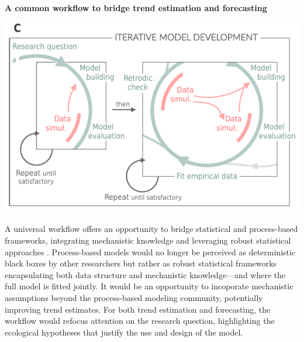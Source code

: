 \documentclass[11pt]{article}
\begin{document}
\begin{tcolorbox}
\centerline{\bf A common workflow to bridge trend estimation and forecasting} %
\vspace*{-3mm}
{\begin{multicols}{2}
\begin{minipage}[t]{\linewidth}
	\vfill
\includegraphics[width=\linewidth]{../figures/iterativeworkflow_details_revised}
\vfill
\vspace*{3mm}
\end{minipage}

\columnbreak
\vspace*{1mm}
A universal workflow offers an opportunity to bridge statistical and process-based frameworks, integrating mechanistic knowledge and leveraging robust statistical approaches \citep[e.g.][]{rounce2020quantifying}. Process-based models would no longer be perceived as deterministic black boxes by other researchers but rather as robust statistical frameworks encapsulating both data structure and mechanistic knowledge---and where the full model is fitted jointly. It would be an opportunity to incoporate mechanistic assumptions beyond the process-based modeling community, potentially improving trend estimates. For both trend estimation and forecasting, the workflow would refocus attention on the research question, highlighting the ecological hypotheses that justify the use and design of the model.

\end{multicols}}

\end{tcolorbox}
\end{document}
